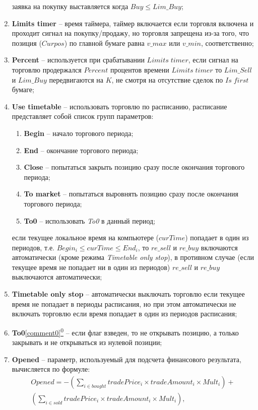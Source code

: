 \begin{enumerate}
		заявка на покупку выставляется когда $Buy \leq Lim\_Buy$;
	\item \textbf{Limits timer} -- время таймера, таймер включается если торговля включена и проходит сигнал на покупку/продажу, но торговля запрещена из-за того, что позиция
		($Curpos$) по главной бумаге равна $v\_max$ или $v\_min$, соответственно;
	\item \textbf{Percent} -- используется при срабатывании $Limits \; timer$, если сигнал на торговлю продержался $Percent$ процентов времени $Limits \; timer$ то $Lim\_Sell$ и $Lim\_Buy$
		передвигаются на $K$, не смотря на отсутствие сделок по $Is \; first$ бумаге;
	\item \textbf{Use timetable} -- использовать торговлю по расписанию, расписание представляет собой список групп параметров:
		\begin{enumerate}
			\item \textbf{Begin} -- начало торгового периода;
			\item \textbf{End} -- окончание торгового периода;
			\item \textbf{Close} -- попытаться закрыть позицию сразу после окончания торгового периода;
			\item \textbf{To market} -- попытаться выровнять позицию сразу после окончания торгового периода;
			\item \textbf{To0} -- использовать \textit{To0} в данный период;
		\end{enumerate}
		если текущее локальное время на компьютере ($curTime$) попадает в один из периодов, т.е. $Begin_i \leq curTime \leq End_i$, то $re\_sell$ и
		$re\_buy$ включаются автоматически (кроме режима \textit{Timetable only stop}), в противном случае (если текущее время не попадает ни в один из периодов) $re\_sell$ и $re\_buy$ выключаются автоматически;
	\item \textbf{Timetable only stop} -- автоматически выключать торговлю если текущее время не попадает в периоды расписания, но при этом автоматически не включать торговлю если время попадает в один из периодов расписания;
	\item \textbf{To0}\hyperref[comment0]{\ref{comment0}\textsuperscript{0}} -- если флаг взведен, то не открывать позицию, а только закрывать и не открываться из нулевой позиции;
	\item \textbf{Opened} -- параметр, используемый для подсчета финансового результата, вычисляется по формуле:
		\begin{align*}
		Opened = -\left( \sum_{i \in bought} tradePrice_i \times tradeAmount_i \times Mult_i \right) + \\ \left( \sum_{i \in sold} tradePrice_i \times tradeAmount_i \times Mult_i \right),

\end{align*}
\end{enumerate}
